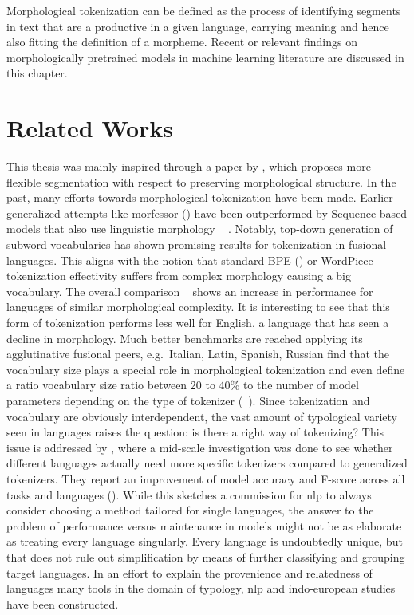 Morphological tokenization can be defined as the process of identifying segments in text that are a productive in a given language, carrying meaning and hence also fitting the definition of a morpheme.
Recent or relevant findings on morphologically pretrained models in machine learning literature are discussed in this chapter.

\section{Related Works}
\label{sec:related-works}

This thesis was mainly inspired through a paper by \citeauthor{FLOTA}, which proposes more flexible segmentation with respect to preserving morphological structure.
In the past, many efforts towards morphological tokenization have been made.
Earlier generalized attempts like morfessor (\cite{morfessor}) have been outperformed by Sequence based models that also use linguistic morphology ~\cite{subwordvsmorfessor} .
Notably, top-down generation of subword vocabularies has shown promising results for tokenization in fusional languages.
This aligns with the notion that standard BPE (\cite{BPE}) or WordPiece ~\cite{WORDPIECEGOOGLE} tokenization effectivity suffers from complex morphology causing a big vocabulary.
The overall comparison ~\cite[134]{subwordvsmorfessor} shows an increase in performance for languages of similar morphological complexity.
It is interesting to see that this form of tokenization performs less well for English, a language that has seen a decline in morphology.
Much better benchmarks are reached applying  its agglutinative fusional peers, e.g.\ Italian, Latin, Spanish, Russian
\citeauthor{TOKENIZATIONIMPACT} find that the vocabulary size plays a special role in morphological tokenization and even define a ratio vocabulary size ratio between 20 to 40\% to the number of model parameters depending on the type of tokenizer (~\cite[11--12]{TOKENIZATIONIMPACT}).
Since tokenization and vocabulary are obviously interdependent, the vast amount of typological variety seen in languages raises the question: is there a right way of tokenizing?
This issue is addressed by \citeauthor{MONOLINGUAL}, where a mid-scale investigation was done to see whether different languages actually need more specific tokenizers compared to generalized tokenizers.
They report an improvement of model accuracy and F-score across all tasks and languages (\cite{MONOLINGUAL}).
While this sketches a commission for \ac{nlp} to always consider choosing a method tailored for single languages, the answer to the problem of performance versus maintenance in models might not be as elaborate as treating every language singularly.
Every language is undoubtedly unique, but that does not rule out simplification by means of further classifying and grouping target languages.
In an effort to explain the provenience and relatedness of languages many tools in the domain of typology, \ac{nlp} and indo-european studies have been constructed.

